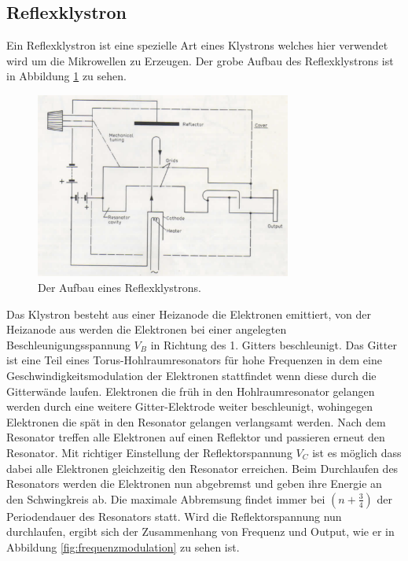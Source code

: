     \subsection{Reflexklystron}
    \label{sec:Reflexklystron}
        Ein Reflexklystron ist eine spezielle Art eines Klystrons welches hier verwendet wird um die Mikrowellen zu Erzeugen.
        Der grobe Aufbau des Reflexklystrons ist in Abbildung \ref{fig:reflexklystron} zu sehen.
        \begin{figure}
            \centering
            \includegraphics[width = 0.75\textwidth]{bilder/Reflexklystron.png}
            \caption{Der Aufbau eines Reflexklystrons.}
            \label{fig:reflexklystron}
        \end{figure}
        Das Klystron besteht aus einer Heizanode die Elektronen emittiert, von der Heizanode aus werden die Elektronen bei einer angelegten Beschleunigungsspannung $V_B$ in Richtung des 1. Gitters beschleunigt.
        Das Gitter ist eine Teil eines Torus-Hohlraumresonators für hohe Frequenzen in dem eine Geschwindigkeitsmodulation der Elektronen stattfindet wenn diese durch die Gitterwände laufen.
        Elektronen die früh in den Hohlraumresonator gelangen werden durch eine weitere Gitter-Elektrode weiter beschleunigt, wohingegen Elektronen die spät in den Resonator gelangen verlangsamt werden. Nach dem Resonator treffen alle Elektronen auf einen Reflektor und passieren erneut den Resonator.
        Mit richtiger Einstellung der Reflektorspannung $V_C$ ist es möglich dass dabei alle Elektronen gleichzeitig den Resonator erreichen.
        Beim Durchlaufen des Resonators werden die Elektronen nun abgebremst und geben ihre Energie an den Schwingkreis ab. Die maximale Abbremsung findet immer bei $(n + \frac{3}{4})$ der Periodendauer des Resonators statt.
        Wird die Reflektorspannung nun durchlaufen, ergibt sich der Zusammenhang von Frequenz und Output, wie er in Abbildung \ref{fig:frequenzmodulation} zu sehen ist.
